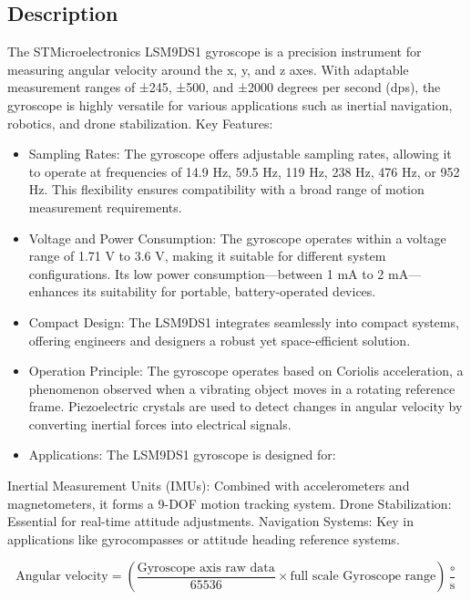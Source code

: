 \subsection{Description}
The STMicroelectronics LSM9DS1 gyroscope is a precision instrument for measuring angular velocity around the x, y, and z axes. With adaptable measurement ranges of ±245, ±500, and ±2000 degrees per second (dps), the gyroscope is highly versatile for various applications such as inertial navigation, robotics, and drone stabilization.\cite{St:2024}
Key Features:
\begin{itemize}
\item Sampling Rates: The gyroscope offers adjustable sampling rates, allowing it to operate at frequencies of 14.9 Hz, 59.5 Hz, 119 Hz, 238 Hz, 476 Hz, or 952 Hz.\cite{St:2024} This flexibility ensures compatibility with a broad range of motion measurement requirements.

\item Voltage and Power Consumption: The gyroscope operates within a voltage range of 1.71 V to 3.6 V, making it suitable for different system configurations.\cite{St:2024} Its low power consumption—between 1 mA to 2 mA—enhances its suitability for portable, battery-operated devices.\cite{St:2024}

\item Compact Design: The LSM9DS1 integrates seamlessly into compact systems, offering engineers and designers a robust yet space-efficient solution.\cite{Maker:2024}

\item Operation Principle: The gyroscope operates based on Coriolis acceleration, a phenomenon observed when a vibrating object moves in a rotating reference frame. Piezoelectric crystals are used to detect changes in angular velocity by converting inertial forces into electrical signals.

\item Applications: The LSM9DS1 gyroscope is designed for:
\end{itemize}
Inertial Measurement Units (IMUs): Combined with accelerometers and magnetometers, it forms a 9-DOF motion tracking system.\cite{Ahmad:2013}
Drone Stabilization: Essential for real-time attitude adjustments.\cite{Ahmad:2013}
Navigation Systems: Key in applications like gyrocompasses or attitude heading reference systems.\cite{Ahmad:2013}

$$ \text{Angular velocity} = \left(\frac{\text{Gyroscope axis raw data}}{65536} \times \text{full scale Gyroscope range}\right) \frac{\circ}{\text{s}} $$

